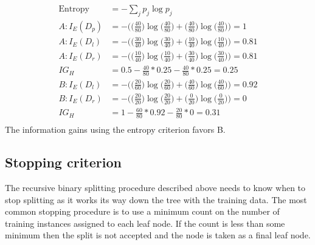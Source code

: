 \documentclass{book}
\begin{document}
\begin{align*}
\mbox{Entropy} &= - \sum_j p_j \log p_j\\
A: I_E(D_p) &= - \bigg(\Big(\frac{40}{80}\Big) \log \Big(\frac{40}{80}\Big) + \Big(\frac{40}{80}\Big) \log \Big(\frac{40}{80}\Big)\bigg) = 1\\
A: I_E(D_l)  &= - \bigg(\Big(\frac{30}{40}\Big) \log \Big(\frac{30}{40}\Big) + \Big(\frac{10}{40}\Big) \log \Big(\frac{10}{40}\Big)\bigg) = 0.81\\
A: I_E(D_r)  &= - \bigg(\Big(\frac{10}{40}\Big) \log \Big(\frac{10}{40}\Big) + \Big(\frac{30}{40}\Big) \log \Big(\frac{30}{40}\Big)\bigg) = 0.81\\
IG_{H} &= 0.5 - \frac{40}{80} * 0.25 - \frac{40}{80} * 0.25 = 0.25 \\
B: I_E(D_l)  &= - \bigg(\Big(\frac{20}{60}\Big) \log \Big(\frac{20}{60}\Big) + \Big(\frac{40}{60}\Big) \log \Big(\frac{40}{60}\Big)\bigg) = 0.92\\
B: I_E(D_r)  &= - \bigg(\Big(\frac{20}{20}\Big) \log \Big(\frac{20}{20}\Big) + \Big(\frac{0}{20}\Big) \log \Big(\frac{0}{20}\Big)\bigg) = 0\\
IG_{H} &= 1 - \frac{60}{80} * 0.92 - \frac{20}{80} * 0 = 0.31 \\
\end{align*}
The information gains using the entropy criterion favors B.


\subsection{Stopping criterion}
The recursive binary splitting procedure described above needs to know when to stop splitting as it works its way down the tree with the training data.
The most common stopping procedure is to use a minimum count on the number of training instances assigned to each leaf node. If the count is less than some minimum then the split is not accepted and the node is taken as a final leaf node.
\end{document}
